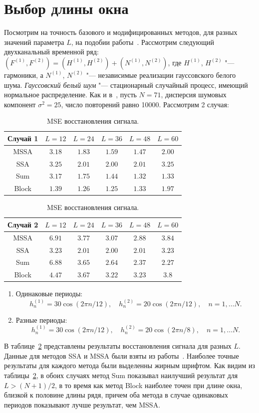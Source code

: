 \documentclass[specialist,
substylefile = spbu_report.rtx,
subf,href,colorlinks=true, 12pt]{disser}
\theoremstyle{definition}
\begin{document}
	\section{Выбор длины окна}
	Посмотрим на точность базового и модифицированных методов, для разных значений параметра $L$, на подобии работы~\cite{mssaR}. Рассмотрим следующий двухканальный временной ряд: $(F^{(1)}, F^{(2)})=(H^{(1)},H^{(2)}) + (N^{(1)},N^{(2)})$, где $H^{(1)}$, $H^{(2)}$ "--- гармоники, а $N^{(1)}$, $N^{(2)}$ "--- независимые реализации гауссовского белого шума. \textit{Гауссовский белый шум} "--- стационарный случайный процесс, имеющий нормальное распределение. Как и в~\cite{mssaR}, пусть $N=71$, дисперсия шумовых компонент $\sigma^2=25$, число повторений равно 10000. Рассмотрим 2 случая:
		\begin{table}[h]
		\centering
		\begin{tabular}{cccccc}\hline
			Случай 1 & $L=12$ & $L=24$ & $L=36$ & $L=48$ & $L=60$\\
			\hline
			MSSA & $3.18$ & $1.83$ & $1.59$ & $\mathbf{1.47}$ & $2.00$\\
			\hline
			SSA & $3.25$ & $\mathbf{2.01}$ & $\mathbf{2.00}$ & $\mathbf{2.01}$ & $3.25$\\
			\hline
			Sum &  $3.17$ & $1.75$ & $1.44$ & $\mathbf{1.32}$ & $\mathbf{1.33}$\\
			\hline
			Block & $1.39$ & $\mathbf{1.26}$ & $\mathbf{1.25}$ & $1.33$ & $1.97$\\
			\hline
		\end{tabular}
		\begin{tabular}{cccccc}\hline
			Случай 2 & $L=12$ & $L=24$ & $L=36$ & $L=48$ & $L=60$\\
			\hline
			MSSA & $6.91$ & $3.77$ & $3.07$ & $\mathbf{2.88}$ & $3.84$\\
			\hline
			SSA & $3.23$ & $\mathbf{2.01}$ & $\mathbf{2.00}$ & $\mathbf{2.01}$ & $3.23$\\
			\hline
			Sum & $6.88$ & $3.65$ & $2.64$ & $2.37$ & $\mathbf{2.27}$\\
			\hline
			Block & $4.47$ & $3.67$ & $\mathbf{3.22}$ & $\mathbf{3.23}$ & $3.8$\\
			\hline
		\end{tabular}
		\caption{MSE восстановления сигнала.}
		\label{tab:mse}
	\end{table}
	\begin{enumerate}
		\item Одинаковые периоды:
		\[
		h_n^{(1)}=30\cos(2\pi n/12),\quad h_n^{(2)}=20\cos(2\pi n/12),\quad n=1,\ldots N.
		\]
		\item Разные периоды:
		\[
		h_n^{(1)}=30\cos(2\pi n/12),\quad h_n^{(2)}=20\cos(2\pi n/8),\quad n=1,\ldots N.
		\]
	\end{enumerate}
	В таблице~\ref{tab:mse} представлены результаты восстановления сигнала для разных $L$. Данные для методов SSA и MSSA были взяты из работы~\cite{mssaR}. Наиболее точные результаты для каждого метода были выделенны жирным шрифтом. Как видим из таблицы~\ref{tab:mse}, в обоих случаях метод Sum показывал наилучший результат для $L>(N+1)/2$, в то время как метод Block наиболее точен при длине окна, близкой к половине длины рядя, причем оба метода в случае одинаковых периодов показывают лучше результат, чем MSSA.
\end{document}
